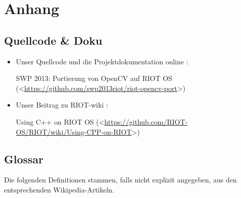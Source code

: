 \documentclass[10pt,a4paper]{article}
\begin{document}
\newpage
\section{Anhang}

\subsection{Quellcode \& Doku}

\begin {itemize}

\item Unser Quellcode und die Projektdokumentation online : 

SWP 2013: Portierung von OpenCV auf RIOT OS \newline (\textless\href{https://github.com/swp2013riot/riot-opencv-port}{https://github.com/swp2013riot/riot-opencv-port}\textgreater) 

\item Unser Beitrag zu RIOT-wiki : 

Using C++ on RIOT OS \newline 
(\textless\href{https://github.com/RIOT-OS/RIOT/wiki/Using-CPP-on-RIOT}{https://github.com/RIOT-OS/RIOT/wiki/Using-CPP-on-RIOT}\textgreater)

\end {itemize}

\subsection{Glossar}

Die folgenden Definitionen stammen, falls nicht explizit angegeben, aus den entsprechenden Wikipedia-Artikeln.
\end{document}
